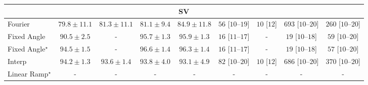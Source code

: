 \begin{tabular}{l|cccc|cccc|}
\cline{1-9}
\multicolumn{9}{c}{\rule{0pt}{8pt}SV} \\
\midrule
Fourier & {\cellcolor[HTML]{88B1D4}} \color[HTML]{000000} $79.8\pm 11.1$ & {\cellcolor[HTML]{75A9CF}} \color[HTML]{F1F1F1} $81.3\pm 11.1$ & {\cellcolor[HTML]{76AAD0}} \color[HTML]{F1F1F1} $81.1\pm 9.4$ & {\cellcolor[HTML]{3D93C2}} \color[HTML]{F1F1F1} $84.9\pm 11.8$ & {\cellcolor[HTML]{FEEBE7}} \color[HTML]{000000} $56$ [$10$--$19$] & {\cellcolor[HTML]{FFF7F3}} \color[HTML]{000000} $10$ [$12$] & {\cellcolor[HTML]{49006A}} \color[HTML]{F1F1F1} $693$ [$10$--$20$] & {\cellcolor[HTML]{FAA2B6}} \color[HTML]{000000} $260$ [$10$--$20$] \\
Fixed Angle & {\cellcolor[HTML]{0569A4}} \color[HTML]{F1F1F1} $90.5\pm 2.5$ & {\cellcolor[HTML]{000000}} \color[HTML]{F1F1F1} {\cellcolor{white}} \color{black} - & {\cellcolor[HTML]{03456C}} \color[HTML]{F1F1F1} $95.7\pm 1.3$ & {\cellcolor[HTML]{034369}} \color[HTML]{F1F1F1} $95.9\pm 1.3$ & {\cellcolor[HTML]{FFF6F2}} \color[HTML]{000000} $16$ [$11$--$17$] & {\cellcolor[HTML]{000000}} \color[HTML]{F1F1F1} {\cellcolor{white}} \color{black} - & {\cellcolor[HTML]{FFF5F1}} \color[HTML]{000000} $19$ [$10$--$18$] & {\cellcolor[HTML]{FEEAE7}} \color[HTML]{000000} $59$ [$10$--$20$] \\
Fixed Angle$^\star$ & {\cellcolor[HTML]{034E7B}} \color[HTML]{F1F1F1} $94.5\pm 1.5$ & {\cellcolor[HTML]{000000}} \color[HTML]{F1F1F1} {\cellcolor{white}} \color{black} - & {\cellcolor[HTML]{023C5F}} \color[HTML]{F1F1F1} $96.6\pm 1.4$ & {\cellcolor[HTML]{023F64}} \color[HTML]{F1F1F1} $96.3\pm 1.4$ & {\cellcolor[HTML]{FFF6F2}} \color[HTML]{000000} $16$ [$11$--$17$] & {\cellcolor[HTML]{000000}} \color[HTML]{F1F1F1} {\cellcolor{white}} \color{black} - & {\cellcolor[HTML]{FFF5F1}} \color[HTML]{000000} $19$ [$10$--$18$] & {\cellcolor[HTML]{FEEBE7}} \color[HTML]{000000} $57$ [$10$--$20$] \\
Interp & {\cellcolor[HTML]{045280}} \color[HTML]{F1F1F1} $94.2\pm 1.3$ & {\cellcolor[HTML]{045687}} \color[HTML]{F1F1F1} $93.6\pm 1.4$ & {\cellcolor[HTML]{045585}} \color[HTML]{F1F1F1} $93.8\pm 4.0$ & {\cellcolor[HTML]{045B8E}} \color[HTML]{F1F1F1} $93.1\pm 4.9$ & {\cellcolor[HTML]{FDE4E1}} \color[HTML]{000000} $82$ [$10$--$20$] & {\cellcolor[HTML]{FFF7F3}} \color[HTML]{000000} $10$ [$12$] & {\cellcolor[HTML]{4C006B}} \color[HTML]{F1F1F1} $686$ [$10$--$20$] & {\cellcolor[HTML]{F25D9F}} \color[HTML]{F1F1F1} $370$ [$10$--$20$] \\
Linear Ramp$^\star$ & {\cellcolor[HTML]{000000}} \color[HTML]{F1F1F1} {\cellcolor{white}} \color{black} - & {\cellcolor[HTML]{000000}} \color[HTML]{F1F1F1} {\cellcolor{white}} \color{black} - & {\cellcolor[HTML]{000000}} \color[HTML]{F1F1F1} {\cellcolor{white}} \color{black} - & {\cellcolor[HTML]{000000}} \color[HTML]{F1F1F1} {\cellcolor{white}} \color{black} - & {\cellcolor[HTML]{000000}} \color[HTML]{F1F1F1} {\cellcolor{white}} \color{black} - & {\cellcolor[HTML]{000000}} \color[HTML]{F1F1F1} {\cellcolor{white}} \color{black} - & {\cellcolor[HTML]{000000}} \color[HTML]{F1F1F1} {\cellcolor{white}} \color{black} - & {\cellcolor[HTML]{000000}} \color[HTML]{F1F1F1} {\cellcolor{white}} \color{black} - \\

\end{tabular}
